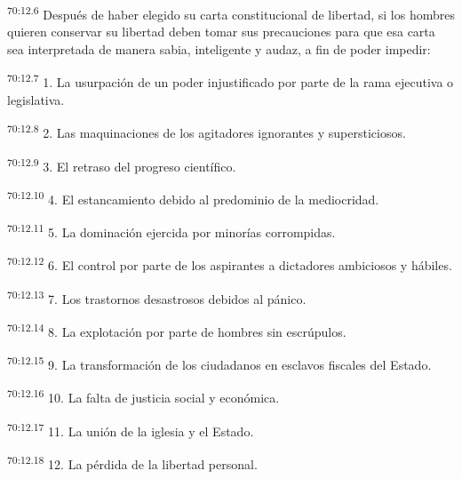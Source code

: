 \par
\textsuperscript{70:12.6} Después de haber elegido su carta constitucional de libertad, si los hombres quieren conservar su libertad deben tomar sus precauciones para que esa carta sea interpretada de manera sabia, inteligente y audaz, a fin de poder impedir:

\par
\textsuperscript{70:12.7} 1. La usurpación de un poder injustificado por parte de la rama ejecutiva o legislativa.

\par
\textsuperscript{70:12.8} 2. Las maquinaciones de los agitadores ignorantes y supersticiosos.

\par
\textsuperscript{70:12.9} 3. El retraso del progreso científico.

\par
\textsuperscript{70:12.10} 4. El estancamiento debido al predominio de la mediocridad.

\par
\textsuperscript{70:12.11} 5. La dominación ejercida por minorías corrompidas.

\par
\textsuperscript{70:12.12} 6. El control por parte de los aspirantes a dictadores ambiciosos y hábiles.

\par
\textsuperscript{70:12.13} 7. Los trastornos desastrosos debidos al pánico.

\par
\textsuperscript{70:12.14} 8. La explotación por parte de hombres sin escrúpulos.

\par
\textsuperscript{70:12.15} 9. La transformación de los ciudadanos en esclavos fiscales del Estado.

\par
\textsuperscript{70:12.16} 10. La falta de justicia social y económica.

\par
\textsuperscript{70:12.17} 11. La unión de la iglesia y el Estado.

\par
\textsuperscript{70:12.18} 12. La pérdida de la libertad personal.

